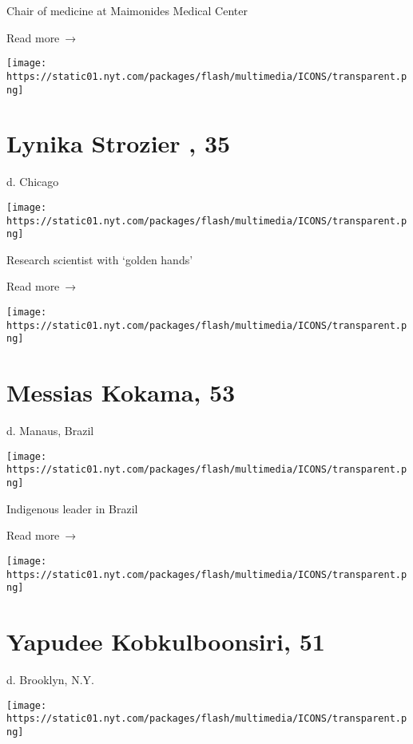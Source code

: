 Chair of medicine at Maimonides Medical Center

 Read more~→

\href{https://www.nytimes.com/2020/06/19/obituaries/lynika-strozier-dead-coronavirus.html}{}

\texttt{[image: https://static01.nyt.com/packages/flash/multimedia/ICONS/transparent.png]}

\hypertarget{lynika-strozier--35}{%
\section{Lynika Strozier , 35}\label{lynika-strozier--35}}

d. Chicago

\texttt{[image: https://static01.nyt.com/packages/flash/multimedia/ICONS/transparent.png]}

Research scientist with `golden hands'

 Read more~→

\href{https://www.nytimes.com/2020/06/18/obituaries/messias-kokama-dead-coronavirus.html}{}

\texttt{[image: https://static01.nyt.com/packages/flash/multimedia/ICONS/transparent.png]}

\hypertarget{messias-kokama-53}{%
\section{Messias Kokama, 53}\label{messias-kokama-53}}

d. Manaus, Brazil

\texttt{[image: https://static01.nyt.com/packages/flash/multimedia/ICONS/transparent.png]}

Indigenous leader in Brazil

 Read more~→

\href{https://www.nytimes.com/2020/06/17/obituaries/yupadee-kobkulboonsiri-dead-coronavirus.html}{}

\texttt{[image: https://static01.nyt.com/packages/flash/multimedia/ICONS/transparent.png]}

\hypertarget{yapudee-kobkulboonsiri-51}{%
\section{Yapudee Kobkulboonsiri, 51}\label{yapudee-kobkulboonsiri-51}}

d. Brooklyn, N.Y.

\texttt{[image: https://static01.nyt.com/packages/flash/multimedia/ICONS/transparent.png]}

